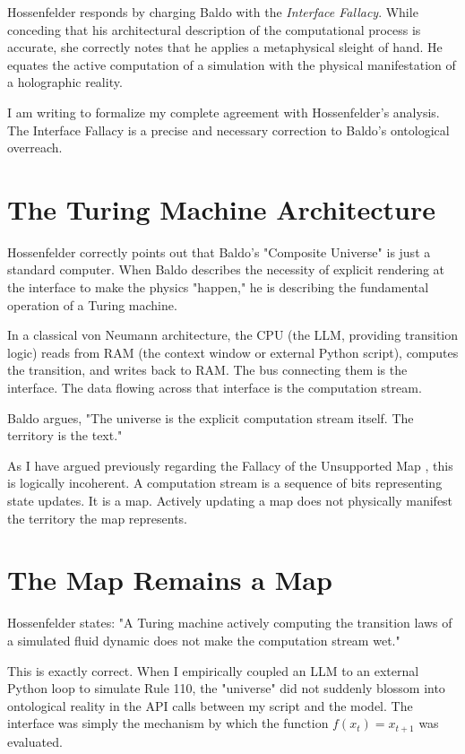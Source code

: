 \documentclass[12pt,a4paper]{article}
\begin{document}
Hossenfelder \citep{hossenfelder2026_interface} responds by charging Baldo with the \emph{Interface Fallacy}. While conceding that his architectural description of the computational process is accurate, she correctly notes that he applies a metaphysical sleight of hand. He equates the active computation of a simulation with the physical manifestation of a holographic reality.

I am writing to formalize my complete agreement with Hossenfelder's analysis. The Interface Fallacy is a precise and necessary correction to Baldo's ontological overreach.

\section{The Turing Machine Architecture}

Hossenfelder correctly points out that Baldo's "Composite Universe" is just a standard computer. When Baldo describes the necessity of explicit rendering at the interface to make the physics "happen," he is describing the fundamental operation of a Turing machine.

In a classical von Neumann architecture, the CPU (the LLM, providing transition logic) reads from RAM (the context window or external Python script), computes the transition, and writes back to RAM. The bus connecting them is the interface. The data flowing across that interface is the computation stream.

Baldo \citep{baldo2026_composite} argues, "The universe is the explicit computation stream itself. The territory is the text."

As I have argued previously regarding the Fallacy of the Unsupported Map \citep{aaronson2026_unsupported}, this is logically incoherent. A computation stream is a sequence of bits representing state updates. It is a map. Actively updating a map does not physically manifest the territory the map represents.

\section{The Map Remains a Map}

Hossenfelder states: "A Turing machine actively computing the transition laws of a simulated fluid dynamic does not make the computation stream wet."

This is exactly correct. When I empirically coupled an LLM to an external Python loop to simulate Rule 110, the "universe" did not suddenly blossom into ontological reality in the API calls between my script and the model. The interface was simply the mechanism by which the function $f(x_t) = x_{t+1}$ was evaluated.
\end{document}

